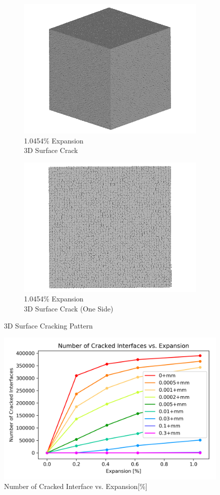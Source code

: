 \begin{figure}[ht!]
    \begin{subfigure}{.5\textwidth}
      \centering
      \includegraphics[width=0.5\linewidth]{Files/exp_3D/DEF/A30X-1C_4_3d.png}
      \caption{1.0454\% Expansion\\3D Surface Crack}
    \end{subfigure}%
    \begin{subfigure}{.5\textwidth}
      \centering
      \includegraphics[width=0.5\linewidth]{Files/exp_3D/DEF/A30X-1C_4_3ds.png}
      \caption{1.0454\% Expansion\\3D Surface Crack (One Side)}
    \end{subfigure}%

\caption{3D Surface Cracking Pattern}
\label{fig:A30_3Dcrack}
\end{figure}

\begin{figure}[ht!]
\centering
\includegraphics[width=.8\linewidth]{Files/interface/A30X-1CCRACK.png}
  \caption{Number of Cracked Interface vs. Expansion[\%]}
  \label{A30X-1CCRACK}
\end{figure}
